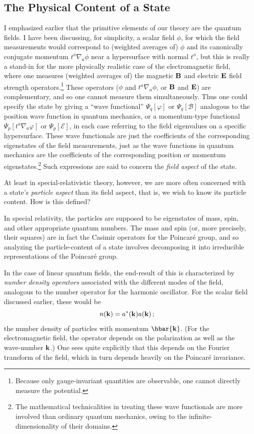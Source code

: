 \documentclass[12pt]{article}
\begin{document}
\subsection{The Physical Content of a State}

I emphasized earlier that the primitive elements of our theory are the quantum fields.  I have been discussing, for simplicity, a scalar field $\phi$, for which the field measurements would correspond to (weighted averages of)  $\phi $ and its canonically conjugate momentum $t^a\nabla _a\phi$ near a hypersurface with normal $t^a$, but this is really a stand-in for the more physically realistic case of the electromagnetic field, where one measures (weighted averages of) the  magnetic ${\bf B}$ and electric ${\bf E}$ field strength operators.\footnote{Because only gauge-invariant quantities are observable, one cannot directly measure the potential.}  These operators ($\phi$ and $t^a\nabla _a\phi$, or ${\bf B}$ and ${\bf E}$) are 
complementary, and so one cannot measure them simultaneously.  Thus one could specify the state by giving a ``wave functional'' $\Psi _q[\varphi ]$ or $\Psi _q [{\mathcal B}]$ analogous to the position wave function in quantum mechanics, or a momentum-type functional 
$\Psi _p[t^a\nabla _a\varphi ]$ or $\Psi _p[{\mathcal E}]$, in each case referring to the field eigenvalues on a specific hypersurface.  These wave functionals are just the coefficients of the corresponding eigenstates of the field measurements, just as the wave functions in quantum mechanics are the coefficients of the corresponding position or momentum eigenstates.\footnote{The mathematical technicalities in treating these wave functionals are more involved than ordinary quantum mechanics, owing to the infinite-dimensionality of their domains.}  Such expressions are said to concern the {\em field aspect} of the state.

At least in special-relativistic theory, however, we are more often concerned with a state's {\em particle aspect} than its field aspect, that is, we wish to know its particle content.  How is this defined?

In special relativity, the particles are supposed to be eigenstates of mass, spin, and other appropriate quantum numbers.  The mass and spin (or, more precisely, their squares) are in fact the Casimir operators for the Poincar\'e group, and so analyzing the particle-content of a state involves decomposing it into irreducible representations of the Poincar\'e group.

In the case of linear quantum fields, the end-result of this is characterized by {\em number density operators} associated with the different modes of the field, analogous to the number operator for the harmonic oscillator.  For the scalar field discussed earlier, these would be 
\begin{equation}
  n({\bf k})=a^*({\bf k}) a({\bf k})\, ;
\end{equation}
the number density of particles with momentum $\hbar{\bf k}$.
(For the electromagnetic field, the operator depends on the polarization as well as the wave-number ${\bf k}$.)
One sees quite explicitly that this depends on the Fourier transform of the field, which in turn depends heavily on the Poincar\'e invariance.
\end{document}
